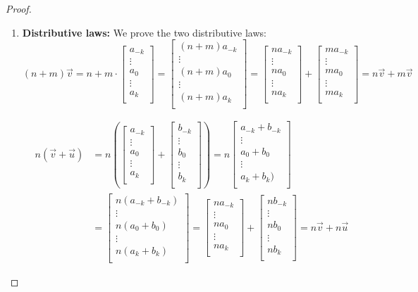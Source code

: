 \documentclass[11pt]{article}
\newcommand{\vect}[1]{\begin{bmatrix}#1\end{bmatrix}}
\begin{document}
\begin{enumerate}[label=\arabic*.]
\begin{proof}
\begin{enumerate}
        \item \textbf{Distributive laws:} We prove the two distributive laws:
        \[
        (n+m)\vec{v}
        =  n + m \cdot \vect{a_{-k} \\ \vdots \\a_0 \\ \vdots \\ a_k \\}
        = \vect{(n+m)a_{-k} \\ \vdots \\(n+m)a_0 \\ \vdots \\ (n+m)a_k \\} 
        = \vect{na_{-k} \\ \vdots \\na_0 \\ \vdots \\ na_k \\} +\vect{ma_{-k} \\ \vdots \\ma_0 \\ \vdots \\ ma_k \\} 
        = n\vec{v} +m\vec{v}
        \]

        \begin{align*}
        n(\vec{v} + \vec{u}) 
        &= n\left(\vect{a_{-k} \\ \vdots \\a_0 \\ \vdots \\ a_k \\} + \vect{b_{-k} \\ \vdots \\b_0 \\ \vdots \\ b_k \\} \right) 
        = n\vect{a_{-k}+b_{-k} \\ \vdots \\a_0+b_0 \\ \vdots \\ a_{k}+ b_{k}) \\}  \\
        &= \vect{n(a_{-k}+b_{-k}) \\ \vdots \\n(a_0+b_0) \\ \vdots \\ n(a_{k}+ b_{k}) \\}
        = \vect{na_{-k} \\ \vdots \\na_0 \\ \vdots \\ na_k \\} + \vect{nb_{-k} \\ \vdots \\nb_0 \\ \vdots \\ nb_k \\}
        = n\vec{v} + n\vec{u}
        \end{align*}
        

\end{enumerate}
\end{proof}
\end{enumerate}
\end{document}
